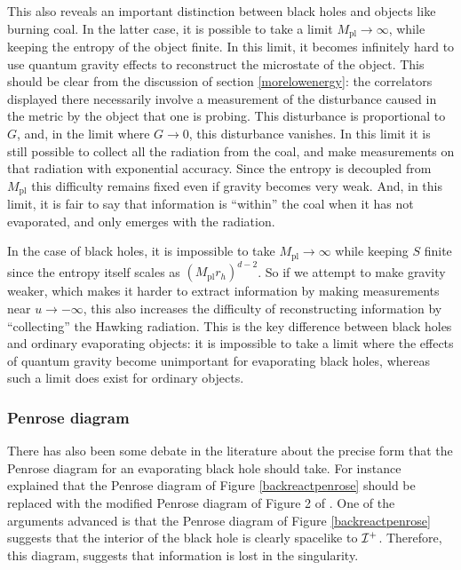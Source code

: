 \documentclass[12pt]{article}
\def\gnewt{G}
\def \scrip{{\cal I}^{+}}
\begin{document}
This also reveals  an important distinction between black holes and objects like burning coal. In the latter case, it is possible to take a limit $M_{\text{pl}} \rightarrow \infty$, while keeping the entropy of the object finite. In this limit, it becomes infinitely hard to use quantum gravity effects to reconstruct the microstate of the object. This should be clear from the discussion of section \ref{morelowenergy}: the correlators displayed there necessarily involve a measurement of the disturbance caused in the metric by the object that one is probing. This disturbance is proportional to $\gnewt$, and, in the limit where $\gnewt \rightarrow 0$, this disturbance vanishes. In this limit it is still possible to collect all the radiation from the coal, and make measurements on that radiation with exponential accuracy. Since the entropy is decoupled from $M_{\text{pl}}$ this difficulty remains fixed even
if gravity becomes very weak. And, in this limit, it is fair to say that information is ``within'' the coal when it has not evaporated, and only emerges with the radiation.

In the case of black holes, it is impossible to take $M_{\text{pl}} \rightarrow \infty$ while keeping $S$ finite since the entropy itself scales as $(M_{\text{pl}} r_h)^{d-2}$. So if we attempt to make gravity weaker, which makes
it harder to extract information by making measurements near $u \rightarrow -\infty$,  this also increases the difficulty of reconstructing information by ``collecting'' the Hawking radiation. This is the key difference between black holes and ordinary evaporating objects: it is impossible to take a limit where the effects of quantum gravity become unimportant for evaporating black holes, whereas such a limit does exist for ordinary objects.




\subsubsection*{Penrose diagram}
There has also been some debate in the literature about the precise form that the Penrose diagram for an evaporating black hole should take. For instance \cite{Ashtekar:2020ifw} explained that the Penrose diagram of Figure \ref{backreactpenrose} should be replaced with the modified  Penrose diagram of Figure 2 of \cite{Ashtekar:2020ifw}.  One of the arguments advanced is that the Penrose diagram of Figure \ref{backreactpenrose} suggests that the interior of the black hole
is clearly spacelike to $\scrip$. Therefore, this diagram, suggests that information is lost in the singularity.
\end{document}
